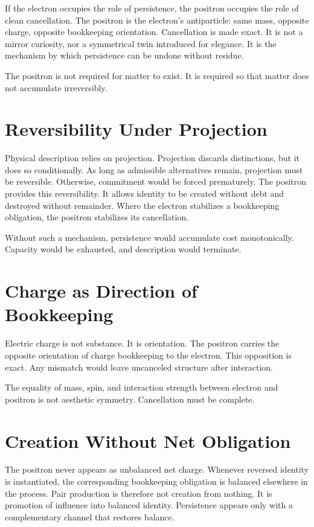 \documentclass[11pt,twoside,openright]{book}
\begin{document}
If the electron occupies the role of persistence, the positron occupies the role of clean cancellation. The positron is the electron's antiparticle: same mass, opposite charge, opposite bookkeeping orientation. Cancellation is made exact. It is not a mirror curiosity, nor a symmetrical twin introduced for elegance. It is the mechanism by which persistence can be undone without residue.

The positron is not required for matter to exist. It is required so that matter does not accumulate irreversibly.

\section*{Reversibility Under Projection}

Physical description relies on projection. Projection discards distinctions, but it does so conditionally. As long as admissible alternatives remain, projection must be reversible. Otherwise, commitment would be forced prematurely. The positron provides this reversibility. It allows identity to be created without debt and destroyed without remainder. Where the electron stabilizes a bookkeeping obligation, the positron stabilizes its cancellation.

Without such a mechanism, persistence would accumulate cost monotonically. Capacity would be exhausted, and description would terminate.

\section*{Charge as Direction of Bookkeeping}

Electric charge is not substance. It is orientation. The positron carries the opposite orientation of charge bookkeeping to the electron. This opposition is exact. Any mismatch would leave uncanceled structure after interaction.

The equality of mass, spin, and interaction strength between electron and positron is not aesthetic symmetry. Cancellation must be complete.

\section*{Creation Without Net Obligation}

The positron never appears as unbalanced net charge. Whenever reversed identity is instantiated, the corresponding bookkeeping obligation is balanced elsewhere in the process. Pair production is therefore not creation from nothing. It is promotion of influence into balanced identity. Persistence appears only with a complementary channel that restores balance.
\end{document}
